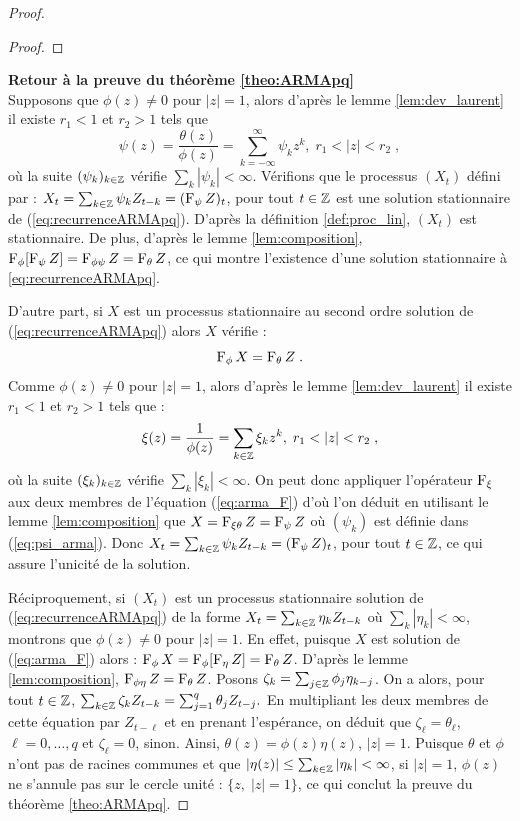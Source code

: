 \begin{proof}
\begin{proof}
\end{proof}

\textbf{Retour \`a la preuve du th\'eor\`eme \ref{theo:ARMApq}}\\

Supposons que $\phi(z)\neq 0$ pour $|z|= 1$, alors d'apr\`es le lemme
\ref{lem:dev_laurent} il existe $r_1<1$ et $r_2>1$ tels que
\begin{equation}\label{eq:psi_arma}
\psi(z)=\frac{\theta(z)}{\phi(z)}=\sum_{k=-\infty}^{\infty} \psi_k z^{k},\; r_1<|z|<r_2\;,
\end{equation}
o\`u la suite $(\psi_k)_{k\in\mathbb{Z}}$ v\'erifie $\sum_k |\psi_k|<\infty$.
V\'erifions que le processus $(X_t)$ d\'efini par : $X_t=\sum_{k\in\mathbb{Z}} \psi_k Z_{t-k}=(\operatorname{F}_{\psi} Z)_t$, pour tout
$t\in\mathbb{Z}$ est une solution stationnaire de (\ref{eq:recurrenceARMApq}). D'apr\`es la d\'efinition
\ref{def:proc_lin}, $(X_t)$ est stationnaire. De plus, d'apr\`es le lemme \ref{lem:composition},
$\operatorname{F}_{\phi}[\operatorname{F}_{\psi} Z]=\operatorname{F}_{\phi\psi}Z=\operatorname{F}_{\theta}Z$, ce qui montre l'existence d'une solution
stationnaire \`a \eqref{eq:recurrenceARMApq}.

D'autre part, si $X$ est un processus stationnaire au second ordre solution de
(\ref{eq:recurrenceARMApq}) alors $X$ v\'erifie :
\begin{equation}\label{eq:arma_F}
\operatorname{F}_{\phi} X=\operatorname{F}_{\theta}Z\;.
\end{equation}
Comme $\phi(z)\neq 0$ pour $|z|= 1$, alors d'apr\`es le lemme
\ref{lem:dev_laurent} il existe $r_1<1$ et $r_2>1$ tels que :
$$
\xi(z)=\frac{1}{\phi(z)}=\sum_{k\in\Zset} \xi_k z^{k},\; r_1<|z|<r_2\;,
$$
o\`u la suite $(\xi_k)_{k\in\mathbb{Z}}$ v\'erifie $\sum_k |\xi_k|<\infty$.
On peut donc appliquer l'op\'erateur $\operatorname{F}_{\xi}$ aux deux membres de l'\'equation
(\ref{eq:arma_F}) d'o\`u l'on d\'eduit en utilisant le lemme \ref{lem:composition}
que $X=\operatorname{F}_{\xi\theta}Z=\operatorname{F}_{\psi} Z$ o\`u $(\psi_k)$ est d\'efinie dans (\ref{eq:psi_arma}).
Donc $X_t=\sum_{k\in\mathbb{Z}} \psi_k Z_{t-k}=(\operatorname{F}_{\psi} Z)_t$, pour tout
$t\in\mathbb{Z}$, ce qui assure l'unicit\'e de la solution.

R\'eciproquement, si $(X_t)$ est un processus stationnaire solution de (\ref{eq:recurrenceARMApq}) de la forme
$X_t=\sum_{k\in\mathbb{Z}}\eta_k Z_{t-k}$ o\`u $\sum_k |\eta_k|<\infty$, montrons que
$\phi(z)\neq 0$ pour $|z|= 1$. En effet, puisque $X$ est solution de (\ref{eq:arma_F})
alors : $\operatorname{F}_{\phi} X=\operatorname{F}_{\phi}[\operatorname{F}_{\eta} Z]=\operatorname{F}_{\theta} Z$. D'apr\`es le lemme \ref{lem:composition},
$\operatorname{F}_{\phi\eta}Z=\operatorname{F}_{\theta} Z$. Posons
$\zeta_k=\sum_{j\in\mathbb{Z}}\phi_j \eta_{k-j}$. On a alors, pour tout $t\in\mathbb{Z}$,
$\sum_{k\in\mathbb{Z}}\zeta_k Z_{t-k}=\sum_{j=1}^q\theta_j Z_{t-j}.$
En multipliant les deux membres de cette \'equation par $Z_{t-\ell}$
et en prenant l'esp\'erance, on d\'eduit que $\zeta_\ell=\theta_\ell$,
$\ell=0,\dots,q$ et $\zeta_\ell=0$, sinon. Ainsi,
$\theta(z)=\phi(z)\eta(z)$, $|z|=1$. Puisque $\theta$ et $\phi$
n'ont pas de racines communes et que $|\eta(z)|\leq\sum_{k\in\mathbb{Z}}|\eta_k|<\infty$,
si $|z|=1$, $\phi(z)$ ne s'annule pas sur le cercle unit\'e :
$\{z,\; |z|=1\}$, ce qui conclut la preuve du th\'eor\`eme \ref{theo:ARMApq}.


\end{proof}
